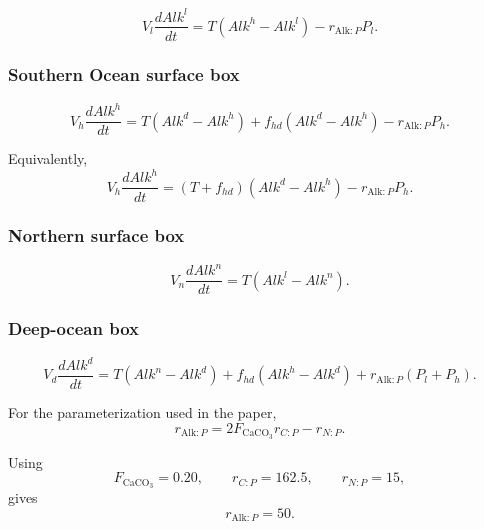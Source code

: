 \documentclass[11pt]{article}
\begin{document}
\begin{equation}
V_l\frac{dAlk^l}{dt}
=
T\left(Alk^h-Alk^l\right)
-
r_{\mathrm{Alk}:P}P_l.
\label{eq:four_alk_l}
\end{equation}

\subsubsection{Southern Ocean surface box}

\begin{equation}
V_h\frac{dAlk^h}{dt}
=
T\left(Alk^d-Alk^h\right)
+
f_{hd}\left(Alk^d-Alk^h\right)
-
r_{\mathrm{Alk}:P}P_h.
\label{eq:four_alk_h}
\end{equation}

Equivalently,
\begin{equation}
V_h\frac{dAlk^h}{dt}
=
\left(T+f_{hd}\right)
\left(Alk^d-Alk^h\right)
-
r_{\mathrm{Alk}:P}P_h.
\end{equation}

\subsubsection{Northern surface box}

\begin{equation}
V_n\frac{dAlk^n}{dt}
=
T\left(Alk^l-Alk^n\right).
\label{eq:four_alk_n}
\end{equation}

\subsubsection{Deep-ocean box}

\begin{equation}
V_d\frac{dAlk^d}{dt}
=
T\left(Alk^n-Alk^d\right)
+
f_{hd}\left(Alk^h-Alk^d\right)
+
r_{\mathrm{Alk}:P}\left(P_l+P_h\right).
\label{eq:four_alk_d}
\end{equation}

For the parameterization used in the paper,
\begin{equation}
r_{\mathrm{Alk}:P}
=
2F_{\mathrm{CaCO_3}}r_{C:P}
-
r_{N:P}.
\label{eq:four_alk_ratio}
\end{equation}

Using
\[
F_{\mathrm{CaCO_3}}=0.20,
\qquad
r_{C:P}=162.5,
\qquad
r_{N:P}=15,
\]
gives
\begin{equation}
r_{\mathrm{Alk}:P}=50.
\label{eq:four_alk_ratio_value}
\end{equation}
\end{document}

